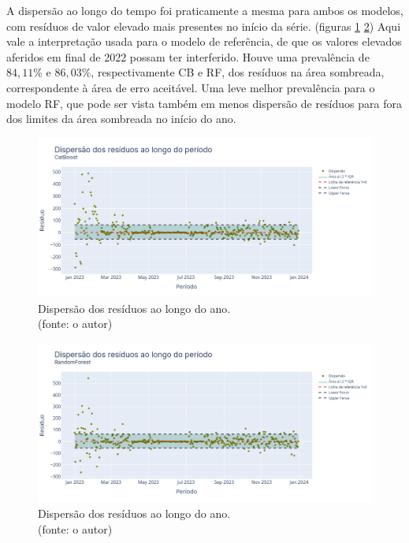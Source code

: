 A dispersão ao longo do tempo foi praticamente a mesma para ambos os modelos, com resíduos de valor elevado mais presentes no início da série. (figuras \ref{fig:jequiti_CB_WFV_LOG_RESID_x_TEMPO} \ref{fig:jequiti_RF_WFV_LOG_RESID_x_TEMPO}) Aqui vale a interpretação usada para o modelo de referência, de que os valores elevados aferidos em final de 2022 possam ter interferido. Houve uma prevalência de $84,11\%$ e $86,03\%$, respectivamente CB e RF, dos resíduos na área sombreada, correspondente à área de erro aceitável. Uma leve melhor prevalência para o modelo RF, que pode ser vista também em menos dispersão de resíduos para fora dos limites da área sombreada no início do ano.

\begin{figure}[!h]
\centering
\includegraphics[scale=0.33]{Figuras/jequiti/resultados/CB_WFV_LOG_RESID_x_TEMPO.png}
\caption{Dispersão dos resíduos ao longo do ano.\\(fonte: o autor)}
\label{fig:jequiti_CB_WFV_LOG_RESID_x_TEMPO}
\end{figure}

\begin{figure}[!h]
\centering
\includegraphics[scale=0.33]{Figuras/jequiti/resultados/RF_WFV_LOG_RESID_x_TEMPO.png}
\caption{Dispersão dos resíduos ao longo do ano.\\(fonte: o autor)}
\label{fig:jequiti_RF_WFV_LOG_RESID_x_TEMPO}
\end{figure}
\clearpage


